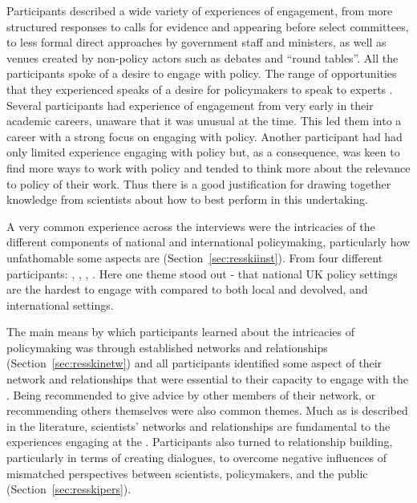 Participants described a wide variety of experiences of engagement, from more structured responses to calls for evidence and appearing before select committees, to less formal direct approaches by government staff and ministers, as well as venues created by non-policy actors such as debates and ``round tables''. All the participants spoke of a desire to engage with policy. 
The range of opportunities that they experienced speaks of a desire for policymakers to speak to experts%
. Several participants had experience of \SPI{} engagement from very early in their academic careers, unaware that it was unusual at the time. This led them into a career with a strong focus on engaging with policy. Another participant had had only limited experience engaging with policy but, as a consequence, was keen to find more ways to work with policy and tended to think more about the relevance to policy of their work. Thus there is a good justification for drawing together knowledge from scientists about how to best perform in this undertaking. 

A very common experience across the interviews were the intricacies of the different components of national and international policymaking, particularly how unfathomable some aspects are (Section~\ref{sec:resskiinst}). From four different participants: , , , . Here one theme stood out - that national UK policy settings are the hardest to engage with compared to both local and devolved, and international settings.

The main means by which participants learned about the intricacies of policymaking was through established networks and relationships (Section~\ref{sec:resskinetw}) and all participants identified some aspect of their network and relationships that were essential to their capacity to engage with the \SPI. Being recommended to give advice by other members of their network, or recommending others themselves were also common themes. Much as is described in the literature, scientists' networks and relationships are fundamental to the experiences engaging at the \SPI. Participants also turned to relationship building, particularly in terms of creating dialogues, to overcome negative influences of mismatched perspectives between scientists, policymakers, and the public  (Section~\ref{sec:resskipers}).

